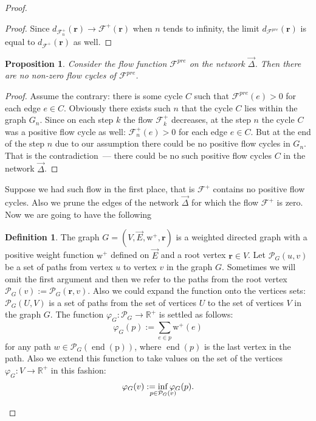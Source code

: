 \documentclass[12pt]{article}
\renewcommand{\cal}[1]{\mathcal{#1}}
\newcommand{\gfi}{\varphi_{G}}
\newtheorem{prop}{Proposition}
\theoremstyle{definition}
\newtheorem{definition}{Definition}
\newcommand{\wtp}{\mathrm{w}^{+}}
\newcommand{\flowpos}{\mathcal{F}^{+}}
\newcommand{\preflow}{\mathcal{F}^{pre}}
\newcommand{\flowposn}[1]{\mathcal{F}_{#1}^{+}}
\renewcommand{\root}{\mathbf{r}}
\newcommand{\onet}{\vec{\Delta}}
\newcommand{\gpaths}{\cal{P}_{G}}
\numberwithin{remark}{section}
\numberwithin{theorem}{section}
\numberwithin{prop}{section}
\numberwithin{equation}{section}
\numberwithin{lemma}{section}
\numberwithin{prop_under_lemma}{lemma}
\begin{document}
\begin{proof}
\begin{proof}
        Since $d_{\flowposn{n}}(\root) \to \flowpos(\root)$ when $n$ tends to infinity,
          the limit $d_{\preflow}(\root)$ is equal to $d_{\flowpos}(\root)$ as well.
      \end{proof}
      \begin{prop}
        Consider the flow function $\preflow$ on the network $\onet$.
        Then there are no non-zero flow cycles of $\preflow$.
      \end{prop}
      \begin{proof}
        Assume the contrary: there is some cycle $C$ such that $\preflow(e) > 0$ for
          each edge $e \in C$.
        Obviously there exists such $n$ that the cycle $C$ lies within the graph $G_n$.
        Since on each step $k$ the flow $\flowposn{k}$ decreases, at the step $n$
          the cycle $C$ was a positive flow cycle as well: $\flowposn{n}(e) > 0$ for each edge $e \in C$.
        But at the end of the step $n$ due to our assumption there could be no positive flow cycles in $G_n$.
        That is the contradiction~--- there could be no such positive flow cycles $C$ in the network $\onet$.
      \end{proof}
      Suppose we had such flow in the first place, that is $\flowpos$ contains no positive flow cycles.
      Also we prune the edges of the network $\onet$ for which the flow $\flowpos$ is zero.
      Now we are going to have the following
      \begin{definition}
        The graph $G = (V, \vec{E},\wtp, \root)$ is a weighted directed graph with a positive
          weight function $\wtp$ defined on $\vec{E}$ and a root vertex $\root \in V$.
        Let $\gpaths(u, v)$ be a set of paths from vertex $u$ to vertex $v$ in the graph $G$.
        Sometimes we will omit the first argument and then we refer to the paths from the root vertex
          $\gpaths(v) := \gpaths(\root, v)$.
        Also we could expand the function onto the vertices sets: $\gpaths(U,V)$ is a set of paths
          from the set of vertices $U$ to the set of vertices $V$ in the graph $G$.
        The function $\gfi: \gpaths \to \mathbb{R}^{+}$ is settled as follows:
        \[
          \gfi(p) := \sum_{e \in p} \wtp(e)
        \]
        for any path $w \in \gpaths(\operatorname{\operatorname{end}(p)})$, where $\operatorname{end}(p)$ is the last vertex in the path.
        Also we extend this function to take values on the set of the vertices $\gfi: V \to \mathbb{R}^{+}$ in this fashion:
        \[
        \gfi(v) := \smashoperator{\inf_{p \in \gpaths(v)}} \gfi(p).
\]
\end{definition}
\end{proof}
\end{document}
